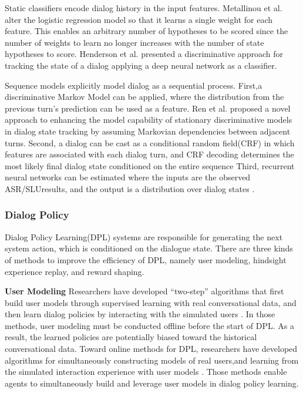 \documentclass[10pt,twocolumn,letterpaper]{article}
\begin{document}
Static classifiers encode dialog history in the input features.  Metallinou et al. \cite{metallinou2013discriminative} alter the logistic regression model so that it learns a single weight for each feature. This enables an arbitrary number of hypotheses to be scored since the number of weights to learn no longer increases with the number of state hypotheses to score.    Henderson et al. \cite{henderson2013deep} presented a discriminative approach for tracking the state of a dialog applying a deep neural network as a classifier.

Sequence models explicitly model dialog as a sequential process. First,a  discriminative Markov Model can be applied, where the distribution from the previous turn’s prediction can be used as a feature. Ren et al. \cite{ren2014markovian}proposed a novel approach to enhancing the model capability of stationary discriminative models in dialog state tracking by assuming Markovian dependencies between adjacent turns. Second, a dialog can be cast as a conditional random field(CRF) in which features are associated with each dialog turn, and CRF decoding determines the most likely final dialog state conditioned on the entire sequence\cite{lee2013recipe,kim2014sequential,ma2016detecting} Third, recurrent neural networks can  be  estimated  where the inputs are the observed  ASR/SLUresults, and the output is a distribution over dialog states \cite{henderson2014robust}.
\subsubsection{Dialog Policy}

Dialog Policy Learning(DPL)  systems  are responsible  for  generating  the  next  system  action, which is conditioned on the dialogue state. There are three kinds of methods to improve the efficiency of DPL, namely user modeling, hindsight experience replay, and reward shaping. 

\textbf{User Modeling} Researchers  have  developed  “two-step”  algorithms that first build user models through supervised learning with real conversational data, and then learn dialog policies by interacting with the simulated users \cite{schatzmann2007agenda,li2016user}. In those methods, user modeling must be conducted offline before the start of DPL. As a result, the learned policies are potentially biased toward the historical conversational data. Toward online methods for DPL, researchers have developed algorithms for simultaneously constructing models of real users,and learning from the simulated interaction experience with user models \cite{su2016line,lipton2016efficient,zhao2016towards,williams2017hybrid,dhingra2016towards,li2017end,liu2017iterative}.  Those methods enable agents to simultaneously build and leverage user models in dialog policy learning.
\end{document}

